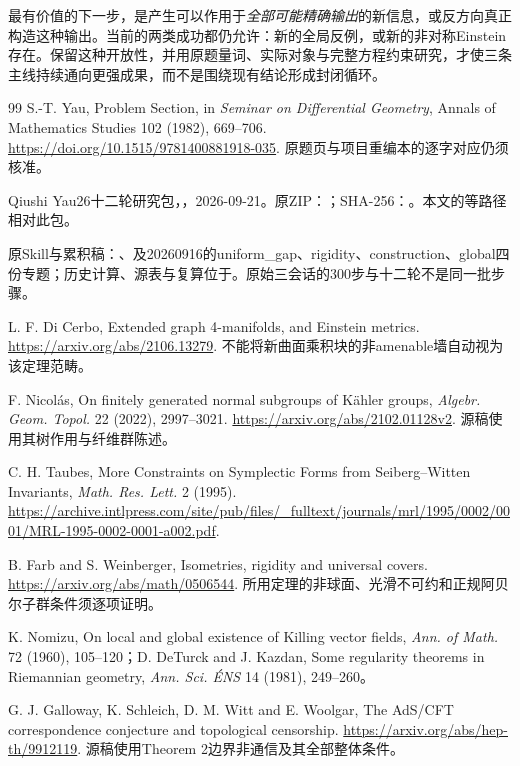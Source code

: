 \documentclass[UTF8,fontset=fandol,zihao=-4]{ctexart}
\theoremstyle{research}
\begin{document}
最有价值的下一步，是产生可以作用于\emph{全部可能精确输出}的新信息，或反方向真正构造这种输出。当前的两类成功都仍允许：新的全局反例，或新的非对称Einstein存在。保留这种开放性，并用原题量词、实际对象与完整方程约束研究，才使三条主线持续通向更强成果，而不是围绕现有结论形成封闭循环。
\begin{thebibliography}{99}
 S.-T. Yau, Problem Section, in \emph{Seminar on Differential Geometry}, Annals of Mathematics Studies 102 (1982), 669--706. \url{https://doi.org/10.1515/9781400881918-035}. 原题页与项目重编本的逐字对应仍须核准。

 Qiushi Yau26十二轮研究包，，2026-09-21。原ZIP：；SHA-256：。本文的等路径相对此包。

 原Skill与累积稿：、及20260916的uniform\_gap、rigidity、construction、global四份专题；历史计算、源表与复算位于。原始三会话的300步与十二轮不是同一批步骤。

 L. F. Di Cerbo, Extended graph 4-manifolds, and Einstein metrics. \url{https://arxiv.org/abs/2106.13279}. 不能将新曲面乘积块的非amenable墙自动视为该定理范畴。

 F. Nicolás, On finitely generated normal subgroups of Kähler groups, \emph{Algebr. Geom. Topol.} 22 (2022), 2997--3021. \url{https://arxiv.org/abs/2102.01128v2}. 源稿使用其树作用与纤维群陈述。

 C. H. Taubes, More Constraints on Symplectic Forms from Seiberg--Witten Invariants, \emph{Math. Res. Lett.} 2 (1995). \url{https://archive.intlpress.com/site/pub/files/_fulltext/journals/mrl/1995/0002/0001/MRL-1995-0002-0001-a002.pdf}.

 B. Farb and S. Weinberger, Isometries, rigidity and universal covers. \url{https://arxiv.org/abs/math/0506544}. 所用定理的非球面、光滑不可约和正规阿贝尔子群条件须逐项证明。

 K. Nomizu, On local and global existence of Killing vector fields, \emph{Ann. of Math.} 72 (1960), 105--120；D. DeTurck and J. Kazdan, Some regularity theorems in Riemannian geometry, \emph{Ann. Sci. ÉNS} 14 (1981), 249--260。

 G. J. Galloway, K. Schleich, D. M. Witt and E. Woolgar, The AdS/CFT correspondence conjecture and topological censorship. \url{https://arxiv.org/abs/hep-th/9912119}. 源稿使用Theorem 2边界非通信及其全部整体条件。


\end{thebibliography}
\end{document}
